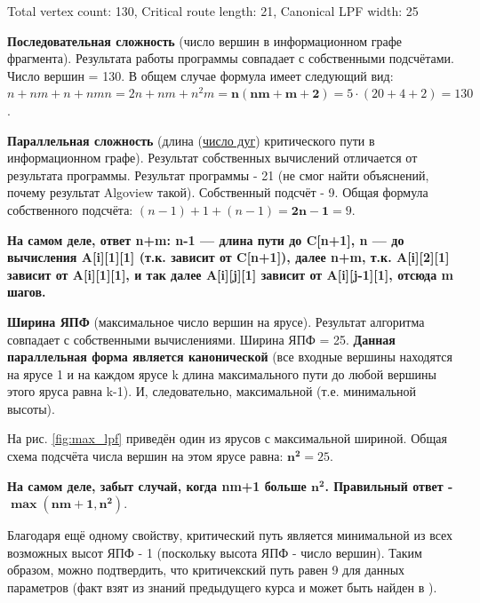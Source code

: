 \documentclass[12pt, fleqn]{article}
\theoremstyle{definition}
\newenvironment{packed_enum}{
\begin{enumerate}
  \setlength{\itemsep}{1pt}
  \setlength{\parskip}{0pt}
  \setlength{\parsep}{0pt}
}{\end{enumerate}}
\begin{document}
Total vertex count: 130, Critical route length: 21, Canonical LPF width: 25
\begin{packed_enum}
 \item \textbf{Последовательная сложность} (число вершин в информационном графе фрагмента). Результата работы программы совпадает с собственными подсчётами. Число вершин = 130. 
 В общем случае формула имеет следующий вид: \\ $n + nm + n + nmn = 2n + nm + n^2m = \mathbf{n(nm + m + 2 )} = 5\cdot(20 + 4 + 2) = 130$.
 \item \textbf{Параллельная сложность} (длина (\underline{число дуг}) критического пути в информационном графе). Результат собственных вычислений отличается от результата программы. Результат программы - 21 (не смог найти объяснений, почему результат Algoview такой). Собственный подсчёт - 9. Общая формула собственного подсчёта: $(n - 1) + 1 + (n - 1) = \mathbf{2n - 1} = 9$.
 
 \textbf{На самом деле, ответ n+m:  n-1 — длина пути до C[n+1], n — до вычисления A[i][1][1] (т.к. зависит от C[n+1]), далее n+m, т.к. A[i][2][1] зависит от A[i][1][1], и так далее A[i][j][1] зависит от A[i][j-1][1], отсюда m шагов.}

 \item \textbf{Ширина ЯПФ} (максимальное число вершин на ярусе). Результат алгоритма совпадает с собственными вычислениями. Ширина ЯПФ = 25. 
 \textbf{Данная параллельная форма является канонической} (все входные вершины находятся на ярусе 1 и на каждом ярусе k длина максимального пути до любой вершины этого яруса равна k-1). И, следовательно, максимальной (т.е. минимальной высоты).
 
 На рис. \ref{fig:max_lpf} приведён один из ярусов с максимальной шириной. Общая схема подсчёта числа вершин на этом ярусе равна: $\mathbf{n^2} = 25$.
 
 \textbf{На самом деле, забыт случай, когда nm+1 больше $\mathbf{n^2}$. Правильный ответ - $\mathbf{\max(nm + 1, n^2)}$}.
 
 Благодаря ещё одному свойству, критический путь является минимальной из всех возможных высот ЯПФ - 1 (поскольку высота ЯПФ - число вершин). Таким образом, можно подтвердить, что критичекский путь равен 9 для данных параметров (факт взят из знаний предыдущего курса и может быть найден в \cite{Voevodin02}).
 

\end{packed_enum}
\end{document}
